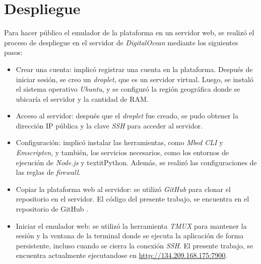 \section{Despliegue}


Para hacer público el emulador de la plataforma en un servidor web, se realizó el proceso de despliegue en el servidor de \textit{DigitalOcean} mediante los siguientes pasos:


\begin{itemize}
	\item Crear una cuenta: implicó registrar una cuenta en la plataforma. Después de iniciar sesión, se creo un \textit{droplet}, que es un servidor virtual. Luego, se instaló el sistema operativo \textit{Ubuntu}, y se configuró la región geográfica donde se ubicaría el servidor y la cantidad de RAM.
	
	\item Acceso al servidor: después que el \textit{droplet} fue creado, se pudo  obtener la dirección IP pública y la clave \textit{SSH} para acceder al servidor.
	
	\item Configuración: implicó instalar las herramientas, como \textit{Mbed CLI} y \textit{Emscripten}, y también, los servicios necesarios, como los entornos de ejecución de \textit{Node.js} y textit{Python}. Además, se realizó las configuraciones de las reglas de \textit{firewall}.

	\item Copiar la plataforma web al servidor: se utilizó \textit{GitHub}  para clonar el repositorio en el servidor. El código del presente trabajo, se encuentra en el repositorio de GitHub \citep{repositorioEmulador}.
	
	\item Iniciar el emulador web: se utilizó la herramienta \textit{TMUX} para mantener la sesión y la ventana de la terminal donde se ejecuta la aplicación de forma persistente, incluso cuando se cierra la conexión  \textit{SSH}. El presente trabajo, se encuentra actualmente ejecutandose en 
\url{http://134.209.168.175:7900}.
\end{itemize}





